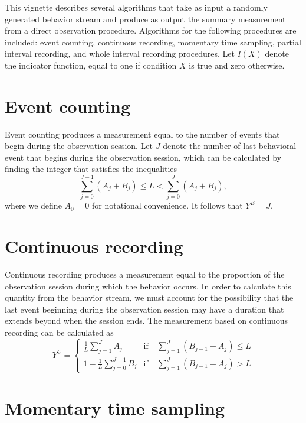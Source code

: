 \documentclass{article}\usepackage[]{graphicx}\usepackage[]{color}
\begin{document}
This vignette describes several algorithms that take as input a randomly generated behavior stream and produce as output the summary measurement from a direct observation procedure. Algorithms for the following procedures are included: event counting, continuous recording, momentary time sampling, partial interval recording, and whole interval recording procedures. Let $I(X)$ denote the indicator function, equal to one if condition $X$ is true and zero otherwise. 

\section{Event counting}

Event counting produces a measurement equal to the number of events that begin during the observation session. Let $J$ denote the number of last behavioral event that begins during the observation session, which can be calculated by finding the integer that satisfies the inequalities \[
\sum_{j=0}^{J-1} \left(A_j + B_j \right) \leq L < \sum_{j=0}^{J} \left(A_j + B_j \right), \]
where we define $A_0 = 0$ for notational convenience. It follows that $Y^E = J$. 

\section{Continuous recording}

Continuous recording produces a measurement equal to the proportion of the observation session during which the behavior occurs. In order to calculate this quantity from the behavior stream, we must account for the possibility that the last event beginning during the observation session may have a duration that extends beyond when the session ends. The measurement based on continuous recording can be calculated as\[
Y^C = \begin{cases}
\frac{1}{L} \sum_{j=1}^J A_j & \text{if}\quad \sum_{j=1}^{J} \left(B_{j-1} + A_j\right) \leq L \\
1 - \frac{1}{L} \sum_{j=0}^{J-1} B_j & \text{if}\quad \sum_{j=1}^{J} \left(B_{j-1} + A_j\right) > L
\end{cases} \]


\section{Momentary time sampling}
\end{document}
